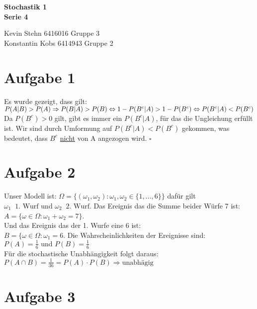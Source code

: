 \documentclass[10pt,a4paper]{article}
\newcommand{\ent}{\mathop{\widehat{=}}}
\newcommand{\w}{\omega}
\begin{document}
\begin{center}
\textbf{Stochastik 1 \\ Serie 4 \\}
\end{center}

\begin{flushright}
Kevin Stehn 6416016 Gruppe 3 \\
Konstantin Kobs 6414943 Gruppe 2
\end{flushright} 

\section*{Aufgabe 1}
Es wurde gezeigt, dass gilt:\\
$P(A|B) > P(A) \Rightarrow P(B|A) > P(B) \newline \Leftrightarrow 1 -P(B^c|A) > 1-P(B^c) \newline \Leftrightarrow P(B^c|A) < P(B^c)$\\
Da $P(B^c) > 0 $ gilt, gibt es immer ein $P(B^c|A)$, f\"ur das die Ungleichung erf\"ullt ist. Wir sind durch Umformung auf $P(B^c|A) < P(B^c)$ gekommen, was bedeutet, dass $B^c$ \underline{nicht} von A angezogen wird. $\square$

\section*{Aufgabe 2}
Unser Modell ist: $\Omega = \{(\w_1,\w_2) : \w_1,\w_2 \in \{1,...,6\} \}$ daf\"ur gilt\\
$\omega_1 \ent \text{1. Wurf}$ und $\w_2 \ent \text{2. Wurf}$.
Das Ereignis das die Summe beider W\"urfe 7 ist:\\
$A = \{\w \in \Omega : \w_1 + \w_2 = 7 \}$.\\
Und das Ereignis das der 1. Wurfe eine 6 ist:\\
$B = \{\w \in \Omega : \w_1 = 6$.
Die Wahrscheinlichkeiten der Ereignisse sind:\\
$P(A) = \frac{1}{6} \text{ und } P(B) = \frac{1}{6}$ \\
F\"ur die stochastische Unabh\"angigkeit folgt daraus:\\
$P(A \cap B) = \frac{1}{36} = P(A) \cdot P(B) \Rightarrow \text{unabh\"agig}$

\section*{Aufgabe 3}
\end{document}
